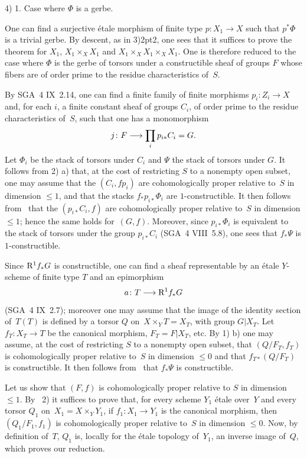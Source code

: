 
4) 1. Case where $\Phi$ is a gerbe.

One can find a surjective \'etale morphism of finite type $p
\colon X_1 \to X$ such that $p^*\Phi$ is a trivial gerbe. By
descent, as in 3)\kern2pt2, one sees that it suffices to prove the
theorem for $X_1$, $X_1\times_X X_1$ and
$X_1\times_X X_1\times_X X_1$. One is therefore reduced to the case where
$\Phi$ is the gerbe of torsors under a constructible sheaf of groups
$F$ whose fibers are of order prime to the
residue characteristics of~$S$.

By SGA~4 IX~2.14, one can find a finite family of
finite morphisms $p_i \colon Z_i \to X$ and, for each $i$, a
finite constant sheaf of groups $C_i$, of order prime to the
residue characteristics of~$S$, such that one has a
monomorphism
$$
j\colon F \to \prod_{i} p_{i*}C_i=G \quoi.
$$
Let $\Phi_i$ be the stack of torsors under $C_i$ and $\Psi$ the stack of
torsors under $G$. It follows from 2)\kern2pt a) that, at the cost of
restricting $S$ to a nonempty open subset, one may assume that the
$(C_i,fp_i)$ are cohomologically proper relative to~$S$ in
dimension $\le 1$, and that the stacks $f_*p_{i*}\Phi_i$ are
$1$-constructible. It then follows from~ that the
$(p_{i*}C_i,f)$ are cohomologically proper relative to~$S$
in dimension $\le 1$; hence the same holds for~$(G,f)$. Moreover,
since $p_{i*}\Phi_i$ is equivalent to the stack of torsors under the
group $p_{i*}C_i$ (SGA~4 VIII~5.8), one sees that $f_*\Psi$ is
$1$-constructible.

Since $\mathrm{R}^1f_*G$ is constructible, one can find a sheaf
representable by an \'etale $Y$-scheme of finite type $T$ and
an epimorphism
$$
a \colon T \to \R^1f_*G
$$
(SGA~4 IX~2.7); moreover one may assume that the image of the identity
section of~$T(T)$ is defined by a torsor $Q$ on~$X\times_Y
T=X_T$, with group $G|X_T$. Let $f_T \colon X_T \to T$ be the canonical
morphism, $F_T=F|X_T$, etc. By 1)\kern2pt b) one may assume,
at the cost of restricting $S$ to a nonempty open subset, that
$(Q/F_T,f_T)$ is cohomologically proper relative to~$S$ in
dimension $\le 0$ and that $f_{T*}(Q/F_T)$ is constructible. It
then follows from~ that $f_*\Psi$ is constructible.

Let us show that $(F,f)$ is cohomologically proper relative to
$S$ in dimension $\le 1$. By ~2) it suffices to
prove that, for every scheme $Y_1$ \'etale over~$Y$ and every
torsor $Q_1$ on~$X_1=X\times_Y Y_1$, if $f_1 \colon X_1 \to Y_1$ is
the canonical morphism, then $(Q_1/F_1,f_1)$ is cohomologically
proper relative to~$S$ in dimension $\le 0$. Now, by
definition of~$T$, $Q_1$ is, locally for the \'etale topology
of~$Y_1$, an inverse image of~$Q$, which proves our
reduction.

